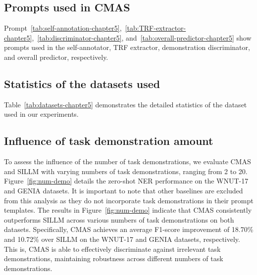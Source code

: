 \subsection{Prompts used in CMAS}
Prompt~\ref{tab:self-annotation-chapter5},~\ref{tab:TRF-extractor-chapter5},~\ref{tab:discriminator-chapter5}, and~\ref{tab:overall-predictor-chapter5} show prompts used in the self-annotator, TRF extractor, demonstration discriminator, and overall predictor, respectively.

\subsection{Statistics of the datasets used}
Table~\ref{tab:datasets-chapter5} demonstrates the detailed statistics of the dataset used in our experiments.





\subsection{Influence of task demonstration amount}
\label{subsec:task demonstration amount}
To assess the influence of the number of task demonstrations, we evaluate \ac{CMAS} and SILLM with varying numbers of task demonstrations, ranging from 2 to 20. Figure~\ref{fig:num-demo} details the zero-shot \ac{NER} performance on the WNUT-17 and GENIA datasets.
It is important to note that other baselines are excluded from this analysis as they do not incorporate task demonstrations in their prompt templates. 
The results in Figure~\ref{fig:num-demo} indicate that \ac{CMAS} consistently outperforms SILLM across various numbers of task demonstrations on both datasets. Specifically, \ac{CMAS} achieves an average F1-score improvement of 18.70\% and 10.72\% over SILLM on the WNUT-17 and GENIA datasets, respectively. This is, \ac{CMAS} is able to effectively discriminate against irrelevant task demonstrations, maintaining robustness across different numbers of task demonstrations.



